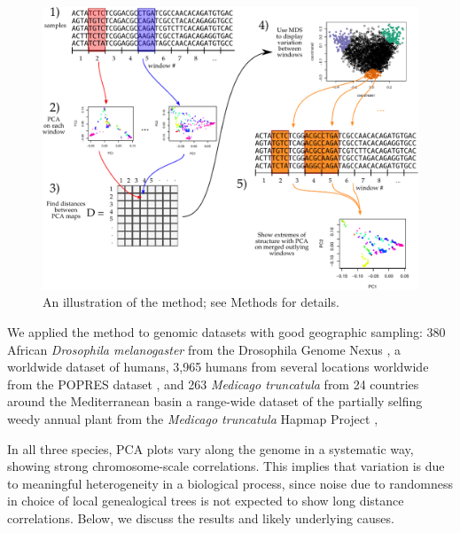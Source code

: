 \documentclass[11pt, oneside]{article}   	%
\begin{document}
\begin{figure}
    \begin{center}
       \includegraphics{the-method-diagram}
    \end{center}
    \caption{
         An illustration of the method; see Methods for details.
         \label{fig:diagram}
    }
\end{figure}

We applied the method to genomic datasets with good geographic sampling:
380 African \textit{Drosophila melanogaster} from the Drosophila Genome Nexus \citep{lack2015drosophila},
a worldwide dataset of humans,
3,965 humans from several locations worldwide from the POPRES dataset \citep{nelson2008population},
and 263 \textit{Medicago truncatula} from 24 countries around the Mediterranean basin 
a range-wide dataset of the partially selfing weedy annual plant 
from the \textit{Medicago truncatula} Hapmap Project \citep{tang2014improved},

In all three species, PCA plots vary along the genome in a systematic way, showing strong chromosome-scale correlations.
This implies that variation is due to meaningful heterogeneity in a biological process,
since noise due to randomness in choice of local genealogical trees
is not expected to show long distance correlations. 
Below, we discuss the results and likely underlying causes.
\end{document}
